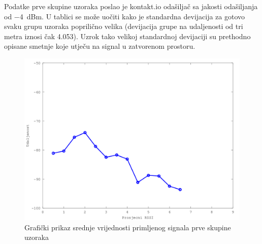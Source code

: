 Podatke prve skupine uzoraka poslao je kontakt.io odašiljač sa jakosti odašiljanja od \SI{-4}{dBm}. 
U tablici se može uočiti kako je standardna devijacija za gotovo svaku grupu uzoraka poprilično velika (devijacija grupe na udaljenosti od tri metra iznosi čak 4.053). 
Uzrok tako velikoj standardnoj devijaciji su prethodno opisane smetnje koje utječu na signal u zatvorenom prostoru. 

\begin{figure}[H]
    \centering
    \includegraphics[scale=0.62]{pictures/prva-skupina-uzoraka}
    \caption{Grafički prikaz srednje vrijednosti primljenog signala prve skupine uzoraka}
    \label{fig:prva_skupina}
\end{figure}


